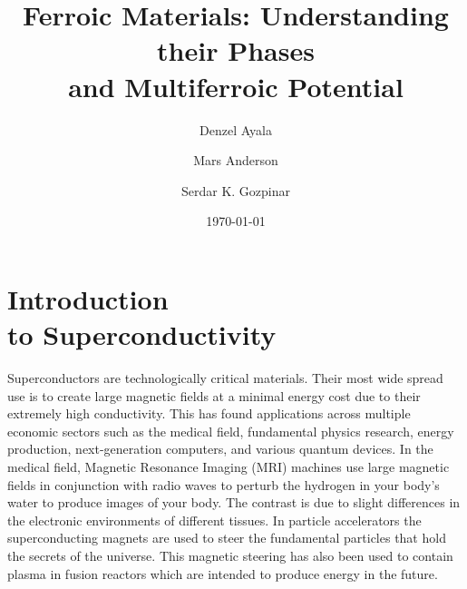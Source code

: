 \documentclass[
reprint,
amsmath,amssymb,
aps,
tikz,
border=5pt
]{revtex4-1}
\begin{document}

\title{Ferroic Materials: Understanding their Phases\\ and Multiferroic Potential}

\author{Denzel Ayala} 
\author{Mars Anderson}
\author{Serdar K. Gozpinar}

%


\date{\today}%

\begin{abstract}

\lipsum[1]

\end{abstract}
\maketitle

\section*{\label{sec:intro}Introduction \\\lowercase{to} Superconductivity}

Superconductors are technologically critical materials. Their most wide spread use is to create large magnetic fields at a minimal energy cost due to their extremely high conductivity. This has found applications across multiple economic sectors such as the medical field, fundamental physics research, energy production, next-generation computers, and various quantum devices.  In the medical field, Magnetic Resonance Imaging (MRI) machines use large magnetic fields in conjunction with radio waves to perturb the hydrogen in your body's water to produce images of your body. The contrast is due to slight differences in the electronic environments of different tissues. In particle accelerators the superconducting magnets are used to steer the fundamental particles that hold the secrets of the universe. This magnetic steering has also been used to contain plasma in fusion reactors which are intended to produce energy in the future.
\end{document}
